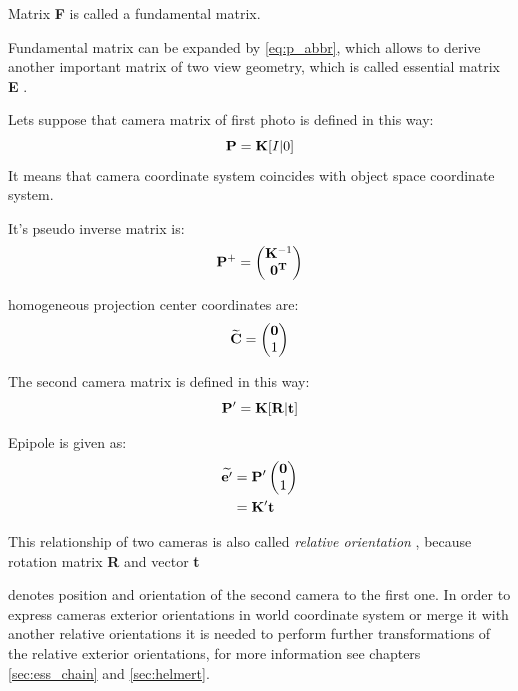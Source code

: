 \documentclass[a4paper,12pt]{article}
\newcommand{\ematr}[1]{
{\bf #1}
}
\newcommand{\evect}[1]{
{\bf #1}
}
\newcommand{\ehvect}[1]{
{\bf \widetilde{#1}}
}
\newcommand{\term}[1]{
{\it #1}
}
\begin{document}

Matrix \ematr{F} is called a fundamental matrix. 

Fundamental matrix can be expanded by \eqref{eq:p_abbr}, which
allows to derive another important matrix of two view geometry, which is called essential matrix \ematr{E}.

Lets suppose that camera matrix of first photo is defined in this way:
\begin{equation}
\label{eq:rel_or_cam1}
\ematr{P}  = \ematr{K} \ematr{[}I|0\ematr{]}
\end{equation}
It means that camera coordinate system coincides with object space coordinate 
system.

It's pseudo inverse matrix is:
\begin{equation}
\ematr{P}^{+} =
\begin{pmatrix}
   \ematr{K}^{-1} \\
   \evect{0^{T}} \\
\end{pmatrix}
\end{equation}

homogeneous projection center coordinates are:
\begin{equation}
\ehvect{C} =
\begin{pmatrix}
   \evect{0} \\
    1 \\
\end{pmatrix}
\end{equation}

The second camera matrix is defined in this way:
\begin{equation}
\label{eq:rel_or_cam2}
\ematr{P}'  = \ematr{K} \ematr{[}\ematr{R}|\evect{t}\ematr{]}
\end{equation}


Epipole is given as:
\begin{equation}
\begin{split}
\label{eg:second_epipole}
\ehvect{e'} &=  \ematr{P'}
\begin{pmatrix}
   \evect{0} \\
    1 \\
\end{pmatrix} \\
&= \ematr{K}' \evect{t}\\
\end{split}
\end{equation}


This relationship of two cameras is also called \term{relative orientation}, because rotation matrix \ematr{R} and vector \evect{t}
denotes position and orientation of the second camera to the first one. In order to express cameras exterior orientations in world coordinate 
system or merge it with another relative orientations it is needed to perform further transformations of the relative 
exterior orientations, for more information see chapters \ref{sec:ess_chain} and \ref{sec:helmert}.
\end{document}
